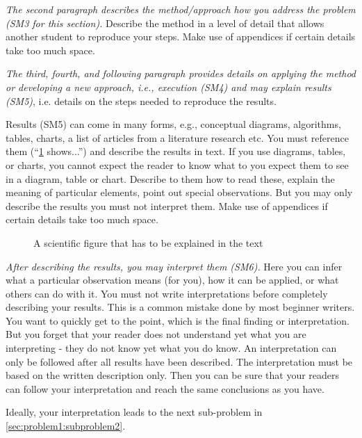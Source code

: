 \documentclass[
  fontsize=10pt
  numbers=noenddot,
  english,  %
  paper=a5,
  twoside,  %
  DIV=calc,
  headings=small,
  bibliography=totoc,
  listof=totoc,
  draft=false
]{scrbook}
\theoremstyle{break}
\begin{document}
\emph{The second paragraph describes the method/approach how you address the problem (SM3 for this section).} Describe the method in a level of detail that allows another student to reproduce your steps.
Make use of appendices %
if certain details take too much space.

\emph{The third, fourth, and following paragraph provides details on applying the method or developing a new approach, i.e., execution (SM4) and may explain results (SM5)}, i.e. details on the steps needed to reproduce the results.

Results (SM5) can come in many forms, e.g., conceptual diagrams, algorithms, tables, charts, a list of articles from a literature research etc. You must reference them (``\cref{fig:my_label} shows...'') and describe the results in text. If you use diagrams, tables, or charts, you cannot expect the reader to know what to you expect them to see in a diagram, table or chart. Describe to them how to read these, explain the meaning of particular elements, point out special observations. But you may only describe the results you must not interpret them. Make use of appendices if certain details take too much space.

\begin{figure}
    \centering
    \caption{A scientific figure that has to be explained in the text}
    \label{fig:my_label}
\end{figure}

\emph{After describing the results, you may interpret them (SM6).} Here you can infer what a particular observation means (for you), how it can be applied, or what others can do with it. You must not write interpretations before completely describing your results. This is a common mistake done by most beginner writers. You want to quickly get to the point, which is the final finding or interpretation. But you forget that your reader does not understand yet what you are interpreting - they do not know yet what you do know. An interpretation can only be followed after all results have been described. The interpretation must be based on the written description only. Then you can be sure that your readers can follow your interpretation and reach the same conclusions as you have.

Ideally, your interpretation leads to the next sub-problem in \cref{sec:problem1:subproblem2}.

\end{document}
